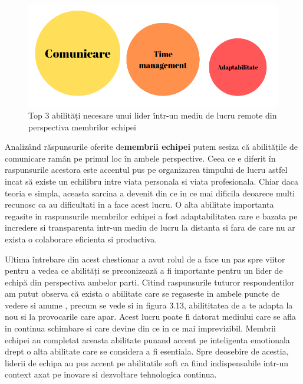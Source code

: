 \documentclass[a4paper, 12pt]{article}
\begin{document}
\begin{enumerate}[A)]
	\quad \begin{figure}[!htb]
			\centering
			\includegraphics[width=15cm, height=6 cm]{"figures/team members- remote.png"}
			\caption {Top 3 abilități necesare unui lider într-un mediu de lucru remote din perspectiva membrilor echipei}\label{fig:four}
			
		\end{figure}

	\quad Analizând răspunsurile oferite de\textbf {membrii echipei} putem sesiza că abilitățile de comunicare ramân pe primul loc în ambele perspective. Ceea ce e diferit în raspunsurile acestora este accentul pus pe organizarea timpului de lucru astfel incat să existe un echilibru intre viata personala si viata profesionala. Chiar daca teoria e simpla, aceasta sarcina a devenit din ce in ce mai dificila deoarece multi recunosc ca au dificultati in a face acest lucru. O alta abilitate importanta regasite in raspunsurile membrilor echipei a fost adaptabilitatea care e bazata pe incredere si transparenta intr-un mediu de lucru la distanta si fara de care nu ar exista o colaborare eficienta si productiva.

	\quad Ultima întrebare din acest chestionar a avut rolul de a face un pas spre viitor pentru a vedea ce abilități se preconizează a fi importante  pentru un lider de echipă din perspectiva ambelor parti. Citind raspunsurile tuturor respondentilor am putut observa că exista o abilitate care se regaseste in ambele puncte de vedere si anume , precum se vede si in figura 3.13, abilititatea de a te adapta la nou si la provocarile care apar.  Acest lucru poate fi datorat mediului care se afla in continua schimbare si care devine din ce in ce mai imprevizibil. Membrii echipei au completat aceasta abilitate punand accent pe inteligenta emotionala drept o alta abilitate care se considera a fi esentiala. Spre deosebire de acestia, liderii de echipa au pus accent pe abilitatile soft ca fiind indispensabile intr-un context axat pe inovare si dezvoltare tehnologica continua.
	


\end{enumerate}
\end{document}
